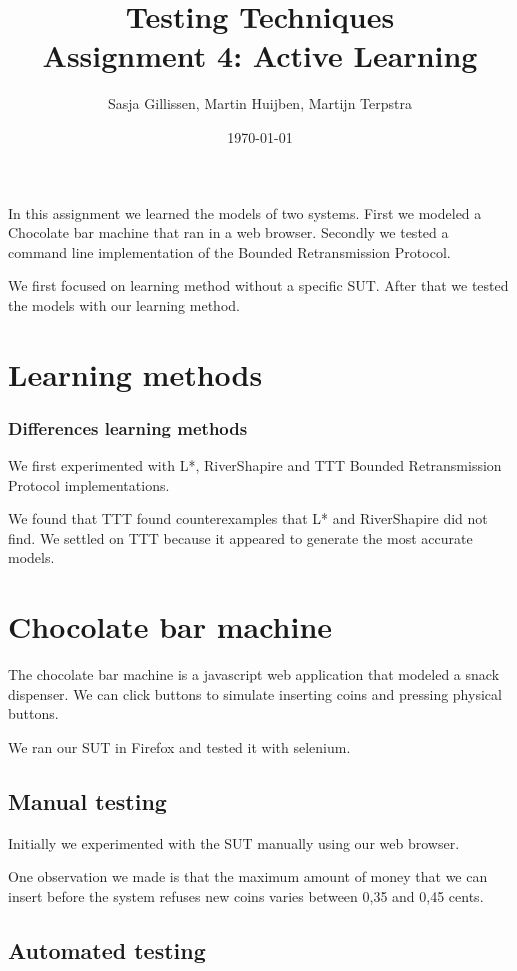 \documentclass[11pt,a4paper]{article}
\author{Sasja Gillissen, Martin Huijben, Martijn Terpstra}
\date{\today}
\title{Testing Techniques\\
  \textbf{Assignment 4: Active Learning}}
\begin{document}
\maketitle

In this assignment we learned the models of two systems. First we
modeled a Chocolate bar machine that ran in a web browser. Secondly we
tested a command line implementation of the Bounded Retransmission Protocol.

We first focused on learning method without a specific SUT. After that
we tested the models with our learning method.

\section{Learning methods}
\subsubsection{Differences learning methods}
We first experimented with L*, RiverShapire and TTT Bounded
Retransmission Protocol implementations.

We found that TTT found counterexamples that L* and RiverShapire did
not find. We settled on TTT because it appeared to generate the most
accurate models.

\section{Chocolate bar machine}
The chocolate bar machine is a javascript web application that modeled
a snack dispenser. We can click buttons to simulate inserting coins
and pressing physical buttons.

We ran our SUT in Firefox and tested it with selenium.

\subsection{Manual testing}
Initially we experimented with the SUT manually using our web browser.

One observation we made is that the maximum amount of money that we
can insert before the system refuses new coins varies between 0,35 and
0,45 cents.

\subsection{Automated testing}
\end{document}
